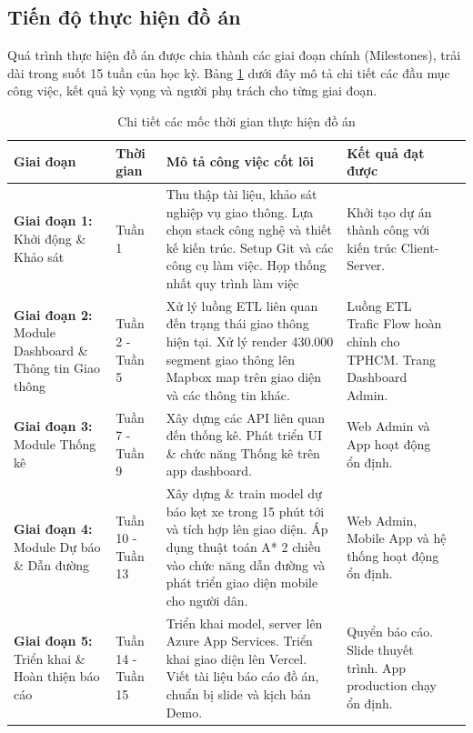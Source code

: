 \subsection{Tiến độ thực hiện đồ án}

Quá trình thực hiện đồ án được chia thành các giai đoạn chính (Milestones), trải dài trong suốt 15 tuần của học kỳ. Bảng \ref{tab:tiendo} dưới đây mô tả chi tiết các đầu mục công việc, kết quả kỳ vọng và người phụ trách cho từng giai đoạn.

\begin{table}[H]
    \centering
    \caption{Chi tiết các mốc thời gian thực hiện đồ án}
    \label{tab:tiendo}
    \renewcommand{\arraystretch}{1.3} %
    \begin{tabular}{|p{}|p{}|p{}|p{}|p{}|}
        \hline
        \textbf{Giai đoạn} & \textbf{Thời gian} & \textbf{Mô tả công việc cốt lõi} & \textbf{Kết quả đạt được} \\ \hline
        
        \textbf{Giai đoạn 1:} Khởi động \& Khảo sát & Tuần 1 & Thu thập tài liệu, khảo sát nghiệp vụ giao thông. Lựa chọn stack công nghệ và thiết kế kiến trúc. Setup Git và các công cụ làm việc. Họp thống nhất quy trình làm việc & Khởi tạo dự án thành công với kiến trúc Client-Server. \\ \hline
        
        \textbf{Giai đoạn 2:} Module Dashboard \& Thông tin Giao thông & Tuần 2 - Tuần 5 & Xử lý luồng ETL liên quan đến trạng thái giao thông hiện tại. Xử lý render 430.000 segment giao thông lên Mapbox map trên giao diện và các thông tin khác. & Luồng ETL Trafic Flow hoàn chỉnh cho TPHCM. Trang Dashboard Admin. \\ \hline
        
        \textbf{Giai đoạn 3:} Module Thống kê & Tuần 7 - Tuần 9 & Xây dựng các API liên quan đến thống kê. Phát triển UI \& chức năng Thống kê trên app dashboard. & Web Admin và App hoạt động ổn định. \\ \hline
        
        \textbf{Giai đoạn 4:} Module Dự báo \& Dẫn đường & Tuần 10 - Tuần 13 & Xây dựng \& train model dự báo kẹt xe trong 15 phút tới và tích hợp lên giao diện. Áp dụng thuật toán A* 2 chiều vào chức năng dẫn đường và phát triển giao diện mobile cho người dân. & Web Admin, Mobile App và hệ thống hoạt động ổn định. \\ \hline
        
        \textbf{Giai đoạn 5:} Triển khai \& Hoàn thiện báo cáo & Tuần 14 - Tuần 15 & Triển khai model, server lên Azure App Services. Triển khai giao diện lên Vercel. Viết tài liệu báo cáo đồ án, chuẩn bị slide và kịch bản Demo. & Quyển báo cáo. Slide thuyết trình. App production chạy ổn định. \\ \hline
    \end{tabular}
\end{table}
